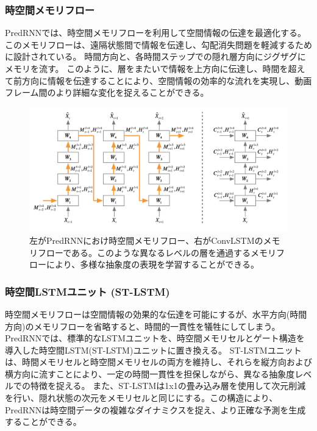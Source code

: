       \subsubsection{時空間メモリフロー}
        PredRNNでは、時空間メモリフローを利用して空間情報の伝達を最適化する。このメモリフローは、遠隔状態間で情報を伝達し、勾配消失問題を軽減するために設計されている。
        時間方向と、各時間ステップでの隠れ層方向にジグザグにメモリを流す。
        このように、層をまたいで情報を上方向に伝達し、時間を超えて前方向に情報を伝達することにより、空間情報の効率的な流れを実現し、動画フレーム間のより詳細な変化を捉えることができる。
        \begin{figure}[htbp]
          \begin{center}
            \includegraphics[width=\textwidth]{figures/videoprediction/predrnn_memory.png}
            \caption{左がPredRNNにおけ時空間メモリフロー、右がConvLSTMのメモリフローである。このような異なるレベルの層を通過するメモリフローにより、多様な抽象度の表現を学習することができる。}
            \label{fig:predrnn}
          \end{center}
        \end{figure}
        
        \subsubsection{時空間LSTMユニット (ST-LSTM)}
          時空間メモリフローは空間情報の効果的な伝達を可能にするが、水平方向(時間方向)のメモリフローを省略すると、時間的一貫性を犠牲にしてしまう。
          PredRNNでは、標準的なLSTMユニットを、時空間メモリセルとゲート構造を導入した時空間LSTM(ST-LSTM)ユニットに置き換える。
          ST-LSTMユニットは、時間メモリセルと時空間メモリセルの両方を維持し、それらを縦方向および横方向に流すことにより、一定の時間一貫性を担保しながら、異なる抽象度レベルでの特徴を捉える。
          また、ST-LSTMは1x1の畳み込み層を使用して次元削減を行い、隠れ状態の次元をメモリセルと同じにする。この構造により、PredRNNは時空間データの複雑なダイナミクスを捉え、より正確な予測を生成することができる。

